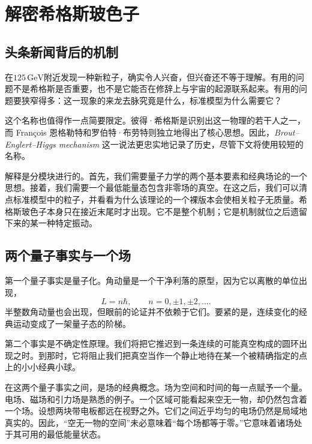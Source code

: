 \chapter{解密希格斯玻色子}


\section{头条新闻背后的机制}

在$125\,\mathrm{GeV}$附近发现一种新粒子，确实令人兴奋，但兴奋还不等于理解。有用的问题不是希格斯是否重要，也不是它能否在修辞上与宇宙的起源联系起来。有用的问题要狭窄得多：这一现象的来龙去脉究竟是什么，标准模型为什么需要它？

这个名称也值得作一点简要限定。彼得·希格斯是识别出这一物理的若干人之一，而 Fran\c{c}ois 恩格勒特和罗伯特·布劳特则独立地得出了核心思想。因此，\emph{Brout--Englert--Higgs mechanism} 这一说法更忠实地记录了历史，尽管下文将使用较短的名称。

解释是分模块进行的。首先，我们需要量子力学的两个基本要素和经典场论的一个思想。接着，我们需要一个最低能量态包含非零场的真空。在这之后，我们可以清点标准模型中的粒子，并看看为什么该理论的一个裸版本会使相关粒子无质量。希格斯玻色子本身只在接近末尾时才出现。它不是整个机制；它是机制就位之后遗留下来的某一种特定振动。

\section{两个量子事实与一个场}

第一个量子事实是量子化。角动量是一个干净利落的原型，因为它以离散的单位出现，
\begin{equation}
L=n\hbar,
\qquad
n=0,\pm1,\pm2,\ldots .
\end{equation}
半整数角动量也会出现，但眼前的论证并不依赖于它们。要紧的是，连续变化的经典运动变成了一架量子态的阶梯。

第二个事实是不确定性原理。我们将把它推迟到一条连续的可能真空构成的圆环出现之时。到那时，它将阻止我们把真空当作一个静止地待在某一个被精确指定的点上的小小经典小球。

在这两个量子事实之间，是场的经典概念。场为空间和时间的每一点赋予一个量。电场、磁场和引力场是熟悉的例子。一个区域可能看起来空无一物，却仍然包含着一个场。设想两块带电板都远在视野之外。它们之间近乎均匀的电场仍然是局域地真实的。因此，``空无一物的空间''未必意味着``每个场都等于零。''它意味着诸场处于其可用的最低能量状态。


